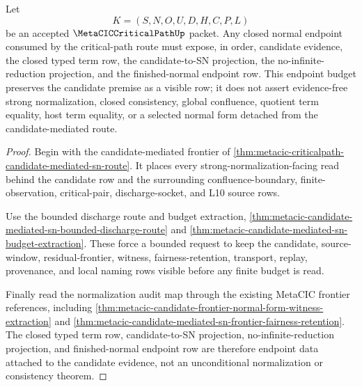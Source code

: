 \begin{theorem}
\label{thm:metacic-candidate-mediated-sn-normal-endpoint-budget}
Let
$$
K=(S,N,O,U,D,H,C,P,L)
$$
be an accepted $\MetaCICCriticalPathUp$ packet. Any closed normal endpoint consumed by the critical-path route must expose, in order, candidate evidence, the closed typed term row, the candidate-to-SN projection, the no-infinite-reduction projection, and the finished-normal endpoint row. This endpoint budget preserves the candidate premise as a visible row; it does not assert evidence-free strong normalization, closed consistency, global confluence, quotient term equality, host term equality, or a selected normal form detached from the candidate-mediated route.
\end{theorem}
\begin{proof}
Begin with the candidate-mediated frontier of \autoref{thm:metacic-criticalpath-candidate-mediated-sn-route}. It places every strong-normalization-facing read behind the candidate row and the surrounding confluence-boundary, finite-observation, critical-pair, discharge-socket, and L10 source rows.

Use the bounded discharge route and budget extraction, \autoref{thm:metacic-candidate-mediated-sn-bounded-discharge-route} and \autoref{thm:metacic-candidate-mediated-sn-budget-extraction}. These force a bounded request to keep the candidate, source-window, residual-frontier, witness, fairness-retention, transport, replay, provenance, and local naming rows visible before any finite budget is read.

Finally read the normalization audit map through the existing MetaCIC frontier references, including \autoref{thm:metacic-candidate-frontier-normal-form-witness-extraction} and \autoref{thm:metacic-candidate-mediated-sn-frontier-fairness-retention}. The closed typed term row, candidate-to-SN projection, no-infinite-reduction projection, and finished-normal endpoint row are therefore endpoint data attached to the candidate evidence, not an unconditional normalization or consistency theorem.
\end{proof}



